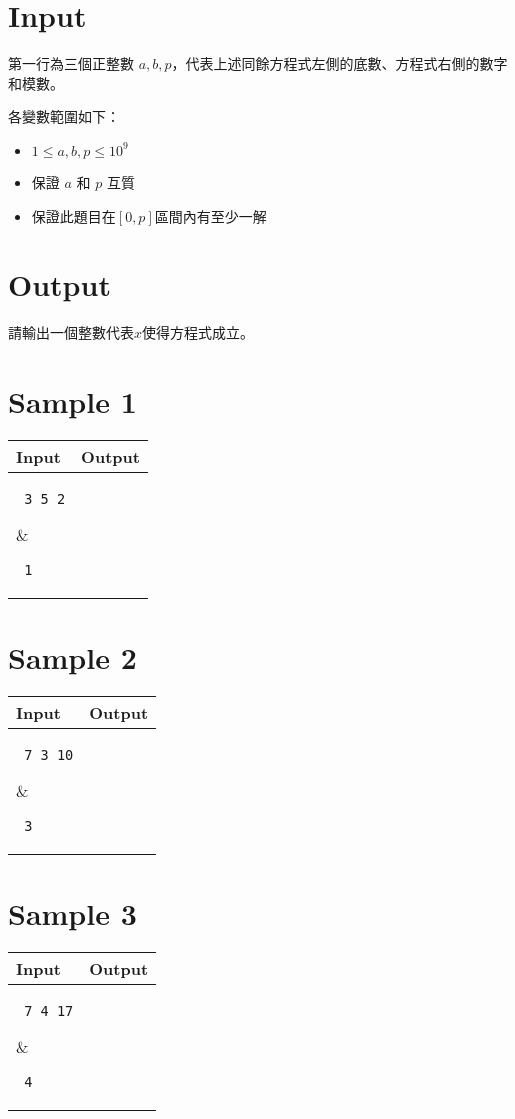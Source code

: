 \documentclass[11pt,a4paper]{article}
\begin{document}
\section*{Input}

第一行為三個正整數 $a, b , p$，代表上述同餘方程式左側的底數、方程式右側的數字和模數。

各變數範圍如下：
\begin{itemize}
    \item $1 \le a, b, p \le 10^9$
	\item 保證 $a$ 和 $p$ 互質
	\item 保證此題目在$ [ 0 , p ]$區間內有至少一解
\end{itemize}

\section*{Output}

請輸出一個整數代表$x$使得方程式成立。

\section*{Sample 1}
\begin{longtable}[!h]{|p{}|p{}|}
\hline
\textbf {Input}	& \textbf {Output} \\
\hline
\parbox[t]{0.5\textwidth} %
{ \tt
3 5 2\\
} &
\parbox[t]{0.5\textwidth}
{ \tt
1\\
} \\
\hline
\end{longtable}

\newpage
\section*{Sample 2}
\begin{longtable}[!h]{|p{}|p{}|}
\hline
\textbf {Input}	& \textbf {Output} \\
\hline
\parbox[t]{0.5\textwidth} %
{ \tt
7 3 10\\
} &
\parbox[t]{0.5\textwidth}
{ \tt
3 \\
} \\
\hline
\end{longtable}

\section*{Sample 3}
\begin{longtable}[!h]{|p{}|p{}|}
\hline
\textbf {Input}	& \textbf {Output} \\
\hline
\parbox[t]{0.5\textwidth} %
{ \tt
7 4 17 \\
} &
\parbox[t]{0.5\textwidth}
{ \tt
4 \\
} \\
\hline
\end{longtable}
\end{document}
